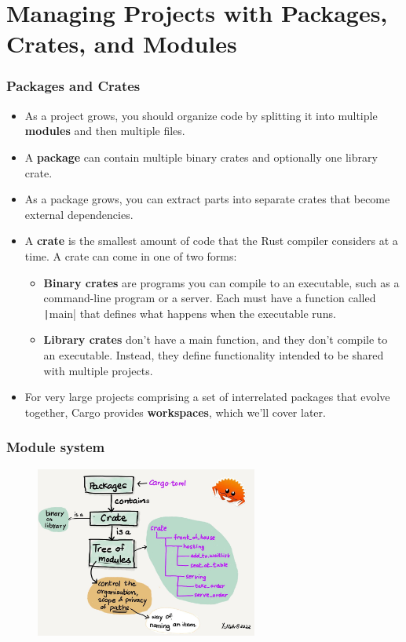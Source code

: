 \documentclass{beamer}
\begin{document}
\section{Managing Projects with Packages, Crates, and Modules}
\begin{frame}[fragile]
	\frametitle{Packages and Crates}
	 \begin{itemize}
	 	\item As a project grows, you should organize code by splitting it into multiple \textbf{modules} and then multiple files. 
	 	\item 	A \textbf{package} can contain multiple binary crates and optionally one library crate. 
	 	\item 	As a package grows, you can extract parts into separate crates that become external dependencies.
	 	\item 	A \textbf{crate} is the smallest amount of code that the Rust compiler considers at a time. A crate can come in one of two forms: 
	 	\begin{itemize}
	 		\item \textbf{Binary crates }are programs you can compile to an executable, such as a command-line program or a server. Each must have a function called \texttt|main| that defines what happens when the executable runs. 
	 		\item 	\textbf{Library crates} don’t have a main function, and they don’t compile to an executable. Instead, they define functionality intended to be shared with multiple projects.
	 	\end{itemize}
	 	
	 	\item 	For very large projects comprising a set of interrelated packages that evolve together, Cargo provides \textbf{workspaces}, which we’ll cover later.
	 \end{itemize}
\end{frame}

\begin{frame}[fragile]
	\frametitle{Module system}
	\begin{figure}
		\centering
		\includegraphics[width=0.65\textwidth]{./img/package.jpeg}
	\end{figure}
\end{frame}
\end{document}
